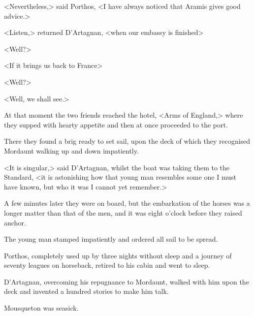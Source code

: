 <Nevertheless,> said Porthos, <I have always noticed that Aramis gives good advice.>

<Listen,> returned D'Artagnan, <when our embassy is finished\longdash>

<Well?>

<If it brings us back to France\longdash>

<Well?>

<Well, we shall see.>

At that moment the two friends reached the hotel, <Arms of England,> where they supped with hearty appetite and then at once proceeded to the port.

There they found a brig ready to set sail, upon the deck of which they recognised Mordaunt walking up and down impatiently.

<It is singular,> said D'Artagnan, whilst the boat was taking them to the Standard, <it is astonishing how that young man resembles some one I must have known, but who it was I cannot yet remember.>

A few minutes later they were on board, but the embarkation of the horses was a longer matter than that of the men, and it was eight o'clock before they raised anchor.

The young man stamped impatiently and ordered all sail to be spread.

Porthos, completely used up by three nights without sleep and a journey of seventy leagues on horseback, retired to his cabin and went to sleep.

D'Artagnan, overcoming his repugnance to Mordaunt, walked with him upon the deck and invented a hundred stories to make him talk.

Mousqueton was seasick.